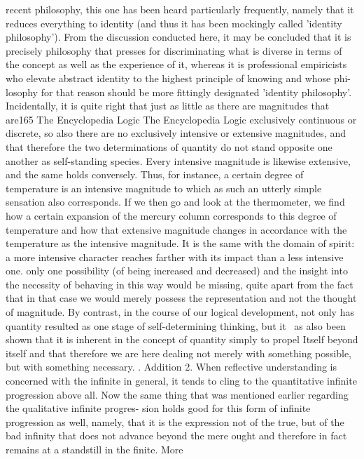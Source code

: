 {{recent philosophy, this one has been heard particularly frequently, namely that
it reduces everything to identity (and thus it has been mockingly called 'identity
philosophy'). From the discussion conducted here, it may be concluded that it
is precisely philosophy that presses for discriminating what is diverse in terms of
the concept as well as the experience of it, whereas it is professional empiricists
who elevate abstract identity to the highest principle of knowing and whose phi-
losophy for that reason should be more fittingly designated 'identity philosophy'.
Incidentally, it is quite right that just as little as there are magnitudes that are165
The Encyclopedia Logic The Encyclopedia Logic
exclusively continuous or discrete, so also there are no exclusively intensive or
extensive magnitudes, and that therefore the two determinations of quantity do
not stand opposite one another as self-standing species. Every intensive magnitude
is likewise extensive, and the same holds conversely. Thus, for instance, a certain
degree of temperature is an intensive magnitude to which as such an utterly simple
sensation also corresponds. If we then go and look at the thermometer, we find
how a certain expansion of the mercury column corresponds to this degree of
temperature and how that extensive magnitude changes in accordance with the
temperature as the intensive magnitude. It is the same with the domain of spirit: a
more intensive character reaches farther with its impact than a less intensive one. only one possibility (of being increased and decreased) and the insight into the
necessity of behaving in this way would be missing, quite apart from the fact that
in that case we would merely possess the representation and not the thought of
magnitude. By contrast, in the course of our logical development, not only has
quantity resulted as one stage of self-determining thinking, but it ~as also been
shown that it is inherent in the concept of quantity simply to propel Itself beyond
itself and that therefore we are here dealing not merely with something possible,
but with something necessary.
.
Addition 2. When reflective understanding is concerned with the infinite in
general, it tends to cling to the quantitative infinite progression above all. Now the
same thing that was mentioned earlier regarding the qualitative infinite progres-
sion holds good for this form of infinite progression as well, namely, that it is the
expression not of the true, but of the bad infinity that does not advance beyond
the mere ought and therefore in fact remains at a standstill in the finite. More
}}
